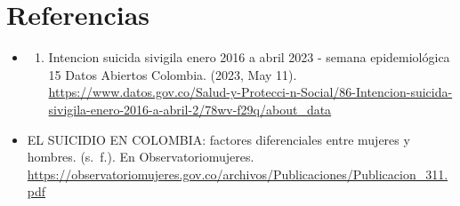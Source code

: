 \documentclass[
]{article}
\providecommand{\tightlist}{%
  \setlength{\itemsep}{0pt}\setlength{\parskip}{0pt}}
\begin{document}
\section{\texorpdfstring{\textbf{Referencias}}{Referencias}}\label{referencias}

\begin{itemize}
\tightlist
\item
  \begin{enumerate}
  \def\labelenumi{\arabic{enumi}.}
  \setcounter{enumi}{85}
  \tightlist
  \item
    Intencion suicida sivigila enero 2016 a abril 2023 - semana
    epidemiológica 15 \textbar{} Datos Abiertos Colombia. (2023, May
    11).
    \url{https://www.datos.gov.co/Salud-y-Protecci-n-Social/86-Intencion-suicida-sivigila-enero-2016-a-abril-2/78wv-f29q/about_data}
  \end{enumerate}
\item
  EL SUICIDIO EN COLOMBIA: factores diferenciales entre mujeres y
  hombres. (s.~f.). En Observatoriomujeres.
  \url{https://observatoriomujeres.gov.co/archivos/Publicaciones/Publicacion_311.pdf}
\end{itemize}
\end{document}
